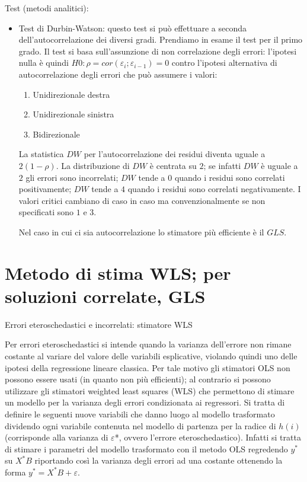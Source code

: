 \documentclass[a4page, 11pt]{article}
\begin{document}
Test (metodi analitici):
\begin{itemize}
\item Test di Durbin-Watson: questo test si può effettuare a seconda dell’autocorrelazione dei diversi gradi. Prendiamo in esame il test per il primo grado.
Il test si basa sull’assunzione di non correlazione degli errori: l’ipotesi nulla è quindi $H0:  \rho =cor( \varepsilon_i  ;  \varepsilon_{i-1} )=0$ contro l’ipotesi alternativa di autocorrelazione degli errori che può assumere i valori:
\begin{enumerate}[noitemsep]
\item Unidirezionale destra
\item Unidirezionale sinistra
\item Bidirezionale	
\end{enumerate}
La statistica $DW$ per l'autocorrelazione dei residui diventa uguale a $2(1-\rho)$. 
La distribuzione di $DW$ è centrata su $2$; se infatti $DW$ è uguale a $2$ gli errori sono incorrelati; $DW$ tende a $0$ quando i residui sono correlati positivamente; $DW$ tende a $4$ quando i residui sono correlati negativamente. I valori critici cambiano di caso in caso ma convenzionalmente se non specificati sono $1$ e $3$. 

Nel caso in cui ci sia autocorrelazione lo stimatore più efficiente è il $GLS$. %

\end{itemize}

\section{Metodo di stima WLS; per soluzioni correlate, GLS }

\begin{itshape}
Errori eteroschedastici e incorrelati: stimatore WLS
\end{itshape}%

Per errori eteroschedastici si intende quando la varianza dell’errore non rimane costante al variare del valore delle variabili esplicative, violando quindi uno delle ipotesi della regressione lineare classica. Per tale motivo gli stimatori OLS non possono essere usati (in quanto non più efficienti); al contrario si possono utilizzare gli stimatori weighted least squares (WLS) che permettono di stimare un modello per la varianza degli errori condizionata ai regressori. 
Si tratta di definire le seguenti nuove variabili che danno luogo al modello trasformato dividendo ogni variabile contenuta nel modello di partenza per la radice di $h(i)$ (corrisponde alla varianza di $\varepsilon$*, ovvero l'errore eteroschedastico). 
Infatti si tratta di stimare i parametri del modello trasformato con il metodo OLS regredendo $y^*$ su $X^*B$ riportando così la varianza degli errori ad una costante ottenendo la forma $y^* = X^*B + \varepsilon$.
\end{document}
